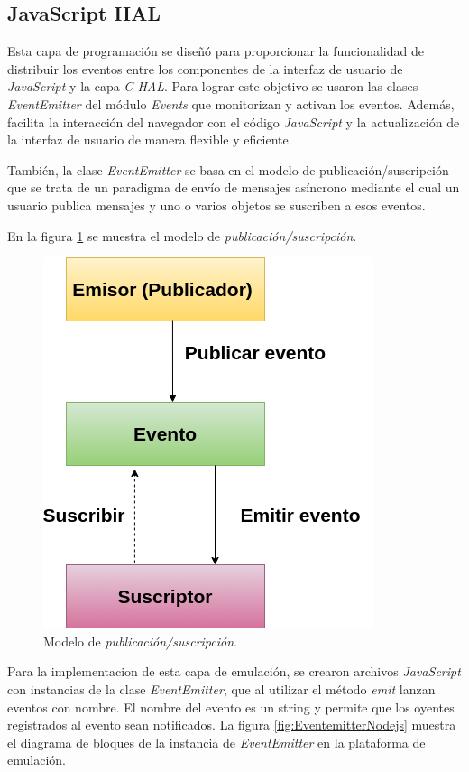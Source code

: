 \subsection{JavaScript HAL}

Esta capa de programación se diseñó para proporcionar la funcionalidad de distribuir los eventos entre los componentes de la interfaz de usuario de \textit{JavaScript} y la capa \textit{C HAL}. Para lograr este objetivo se usaron las clases \textit{EventEmitter} del módulo \textit{Events} que monitorizan y activan los eventos. Además, facilita la interacción del navegador con el código \textit{JavaScript} y la actualización de la interfaz de usuario de manera flexible y eficiente.

También, la clase \textit{EventEmitter} se basa en el modelo de publicación/suscripción que se trata de un paradigma de envío de mensajes asíncrono mediante el cual un usuario publica mensajes y uno o varios objetos se suscriben a esos eventos.

En la figura \ref{fig:PublicarSuscribir} se muestra el modelo de \textit{publicación/suscripción}.

\begin{figure}[ht]
	\centering
	\includegraphics[scale=.49]{./Figures/PublicarSuscribir.png}
	\caption{Modelo de \textit{publicación/suscripción}.}
	\label{fig:PublicarSuscribir}
\end{figure}


Para la implementacion de esta capa de emulación, se crearon archivos \textit{JavaScript} con instancias de la clase \textit{EventEmitter}, que al utilizar el método \textit{emit} lanzan eventos con nombre. El nombre del evento es un string y permite que los oyentes registrados al evento sean notificados. La figura \ref{fig:EventemitterNodejs} muestra el diagrama de bloques de la instancia de \textit{EventEmitter} en la plataforma de emulación.

